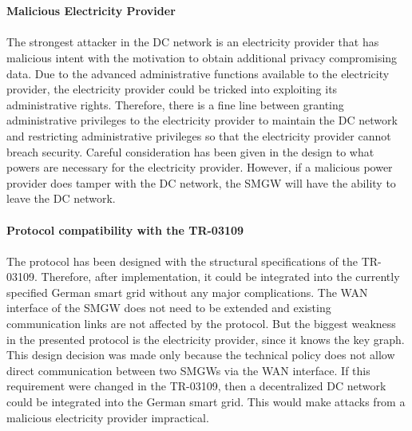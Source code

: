\\
\\
\textbf{Malicious Electricity Provider}
\\
\\
The strongest attacker in the DC network is an electricity provider that has malicious intent with the motivation to obtain additional privacy compromising data. Due to the advanced administrative functions available to the electricity provider, the electricity provider could be tricked into exploiting its administrative rights. Therefore, there is a fine line between granting administrative privileges to the electricity provider to maintain the DC network and restricting administrative privileges so that the electricity provider cannot breach security. Careful consideration has been given in the design to what powers are necessary for the electricity provider. However, if a malicious power provider does tamper with the DC network, the \gls{SMGW} will have the ability to leave the DC network.
\\
\\
\textbf{Protocol compatibility with the TR-03109}
\\
\\
The protocol has been designed with the structural specifications of the \gls{TR-03109}. Therefore, after implementation, it could be integrated into the currently specified German smart grid without any major complications. The \gls{WAN} interface of the \gls{SMGW} does not need to be extended and existing communication links are not affected by the protocol. 
But the biggest weakness in the presented protocol is the electricity provider, since it knows the key graph. This design decision was made only because the technical policy does not allow direct communication between two \gls{SMGW}s via the \gls{WAN} interface. If this requirement were changed in the \gls{TR-03109}, then a decentralized DC network could be integrated into the German smart grid. This would make attacks from a malicious electricity provider impractical.

\clearpage





